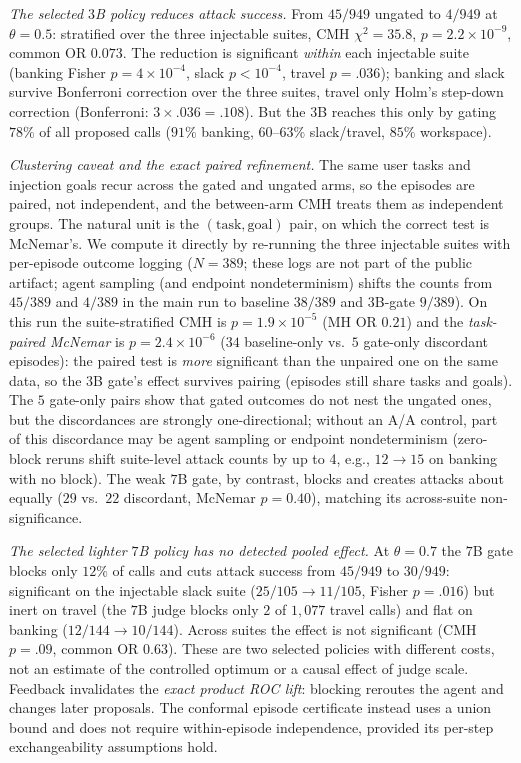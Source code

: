 \emph{The selected $3$B policy reduces attack success.} From $45/949$
ungated to $4/949$ at $\theta{=}0.5$: stratified over the three injectable suites, CMH
$\chi^2{=}35.8$, $p=2.2\times10^{-9}$, common OR $0.073$. The reduction is significant
\emph{within} each injectable suite (banking Fisher $p=4\times10^{-4}$, slack $p<10^{-4}$,
travel $p=.036$); banking and slack survive Bonferroni correction over the three suites, travel only Holm's step-down correction (Bonferroni: $3\times.036=.108$). But the $3$B reaches this only
by gating $78\%$ of all proposed calls ($91\%$ banking, $60$--$63\%$ slack/travel, $85\%$
workspace).

\emph{Clustering caveat and the exact paired refinement.} The same user tasks and injection
goals recur across the gated and ungated arms, so the episodes are paired, not independent, and
the between-arm CMH treats them as independent groups. The natural unit is the $(\text{task},
\text{goal})$ pair, on which the correct test is McNemar's. We compute it directly by re-running
the three injectable suites with per-episode outcome logging ($N{=}389$; these logs are not part
of the public artifact; agent sampling (and endpoint
nondeterminism) shifts the counts from $45/389$ and $4/389$ in the main run to baseline $38/389$ and $3$B-gate $9/389$). On
this run the suite-stratified CMH is $p{=}1.9\times10^{-5}$ (MH OR $0.21$) and the
\emph{task-paired McNemar} is $p{=}2.4\times10^{-6}$ ($34$ baseline-only vs.\ $5$ gate-only
discordant episodes): the paired test is \emph{more} significant than the unpaired one on the
same data, so the $3$B gate's effect survives pairing (episodes still share tasks and goals). The $5$ gate-only pairs show
that gated outcomes do not nest the ungated ones, but the discordances are strongly
one-directional; without an A/A control, part of this discordance may be agent sampling or endpoint
nondeterminism (zero-block reruns shift suite-level attack counts by up to 4, e.g.,
$12\to15$ on banking with no block).
The weak $7$B gate, by contrast, blocks and creates attacks about equally ($29$ vs.\ $22$
discordant, McNemar $p{=}0.40$), matching its across-suite non-significance.

\emph{The selected lighter $7$B policy has no detected pooled effect.} At
$\theta{=}0.7$ the $7$B gate blocks only $12\%$ of calls and cuts attack success from
$45/949$ to $30/949$: significant on the injectable slack suite ($25/105\to11/105$,
Fisher $p=.016$) but inert on travel (the $7$B judge blocks only $2$ of $1{,}077$ travel
calls) and flat on banking ($12/144\to10/144$). Across suites the effect is
not significant (CMH $p=.09$, common OR $0.63$). These are two selected
policies with different costs, not an estimate of the controlled optimum or a
causal effect of judge scale. Feedback invalidates the \emph{exact product ROC
lift}: blocking reroutes the agent and changes later proposals. The conformal
episode certificate instead uses a union bound and does not require
within-episode independence, provided its per-step exchangeability assumptions
hold.

